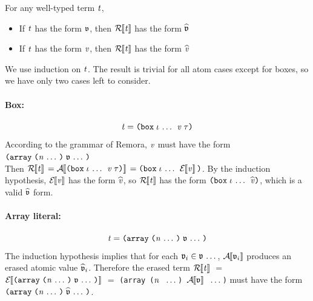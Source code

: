 \begin{lemma}
  \label{ValEraseToVal}
  For any well-typed term $\mathit{t}$,
  \begin{itemize}
  \item If $\mathit{t}$ has the form $\mathfrak{v}$, then $\mathcal{R}{\hskip-.25em}\left\llbracket \mathit{t} \right\rrbracket$ has the form $\widehat{\mathfrak{v}}$
  \item If $\mathit{t}$ has the form $\mathit{v}$, then $\mathcal{R}{\hskip-.25em}\left\llbracket \mathit{t} \right\rrbracket$ has the form $\widehat{\mathit{v}}$
  \end{itemize}
\end{lemma}
\begin{sproof}
  We use induction on $\mathit{t}$.
  The result is trivial for all atom cases except for boxes,
  so we have only two cases left to consider.

  \paragraph{Box:}
  \[\term = \dsum{\sequence{\idx}}{\val}{\type}\]
  According to the grammar of Remora,
  $\mathit{v}$ must have the form
  $\arrlit{\sequence{\atval}}{\sequence{\nat}}$ \\
  Then $\mathcal{R}{\hskip-.25em}\left\llbracket \mathit{t} \right\rrbracket$
  $= \EraseA{\dsum{\sequence{\idx}}{\val}{\type}}$
  $= \dsum{\sequence{\idx}}{\EraseE{\val}}{}$.
  By the induction hypothesis,
  $\mathcal{E}{\hskip-.25em}\left\llbracket \mathit{v} \right\rrbracket$ has the form $\widehat{\mathit{v}}$,
  so $\mathcal{R}{\hskip-.25em}\left\llbracket \mathit{t} \right\rrbracket$
  has the form $\dsum{\sequence{\idx}}{\evalue}{}$,
  which is a valid $\widehat{\mathfrak{v}}$ form.

  \paragraph{Array literal:}
  \[\term = \arrlit{\sequence{\atval}}{\sequence{\nat}}\]
  The induction hypothesis implies that
  for each $\mathfrak{v}_i \in \mathfrak{v} \, \ldots \,$,
  $\mathcal{A}{\hskip-.25em}\left\llbracket \mathfrak{v}_i \right\rrbracket$ produces an erased atomic value $\widehat{\mathfrak{v}}_i$.
  Therefore the erased term $\mathcal{R}{\hskip-.25em}\left\llbracket \mathit{t} \right\rrbracket$
  $=$
  $\EraseE{\arrlit{\sequence{\atval}}{\sequence{\nat}}}$
  $=$
  {\tt (array ($\mathit{n}$ $\, \ldots \,$) $\mathcal{A}{\hskip-.25em}\left\llbracket \mathfrak{v} \right\rrbracket$ $\, \ldots \,$)}
  must have the form
  $\arrlit{\sequence{\eatvalue}}{\sequence{\nat}}$.
\end{sproof}

